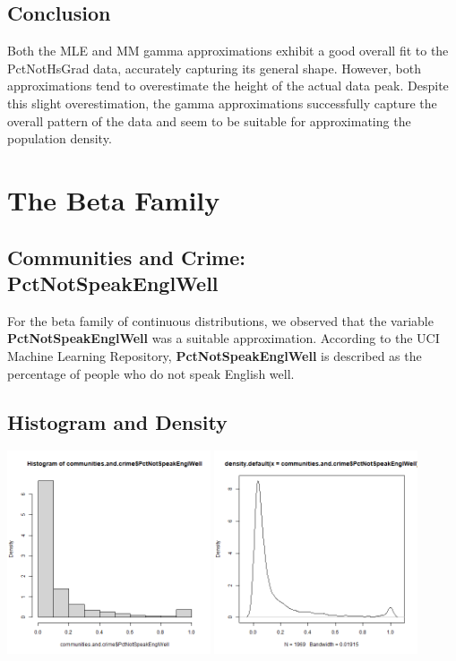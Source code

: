 \documentclass[12pt, letterpaper]{report}
\begin{document}
\section{Conclusion}
Both the MLE and MM gamma approximations exhibit a good overall fit to the PctNotHsGrad data, accurately capturing its general shape.
However, both approximations tend to overestimate the height of the actual data peak.
Despite this slight overestimation, the gamma approximations successfully capture the overall pattern of the data and seem to be suitable for approximating the population density.

\maketitle
\chapter{The Beta Family}
\section{Communities and Crime: PctNotSpeakEnglWell}

For the beta family of continuous distributions, we observed that the variable \textbf{PctNotSpeakEnglWell} was a suitable approximation. 
According to the UCI Machine Learning Repository, \textbf{PctNotSpeakEnglWell} is described as the percentage of people who do not speak English well. 


\section{Histogram and Density}


\begin{center}
\includegraphics[width=0.45\textwidth]{beta/PctNotSpeakEnglWell_hist}
\includegraphics[width=0.45\textwidth]{beta/PctNotSpeakEnglWell_density}
\end{center}
\end{document}
